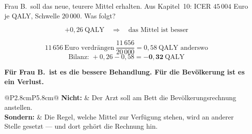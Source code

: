 \begin{aufgabe}
Frau B.\ soll das neue, teurere Mittel erhalten. Aus Kapitel~10: ICER $45\,004$ Euro je QALY, Schwelle $20\,000$. Was folgt?

\loesung
{}
\[ +0{,}26 \ \text{QALY} \quad\Longrightarrow\quad \text{das Mittel ist besser} \]

\[ 11\,656 \ \text{Euro verdrängen} \ \frac{11\,656}{20\,000} = 0{,}58 \ \text{QALY anderswo} \]
\[ \text{Bilanz: } +0{,}26 - 0{,}58 = \mathbf{-0{,}32} \ \text{QALY} \]

\begin{center}
\begin{minipage}{0.9\textwidth}
\textbf{Für Frau B.\ ist es die bessere Behandlung. Für die Bevölkerung ist es ein Verlust.}
\end{minipage}
\end{center}

\begin{center}
{\small
\renewcommand{\arraystretch}{1.5}
\begin{tabular}{@{}P{2.8cm}P{5.8cm}@{}}
\toprule
\textbf{Nicht:} & Der Arzt soll am Bett die Bevölkerungsrechnung anstellen.\\
\textbf{Sondern:} & Die Regel, welche Mittel zur Verfügung stehen, wird an anderer Stelle gesetzt --- und dort gehört die Rechnung hin.\\
\bottomrule
\end{tabular}}
\end{center}

\begin{center}
\begin{minipage}{0.88\textwidth}
\end{minipage}
\end{center}
\end{aufgabe}


